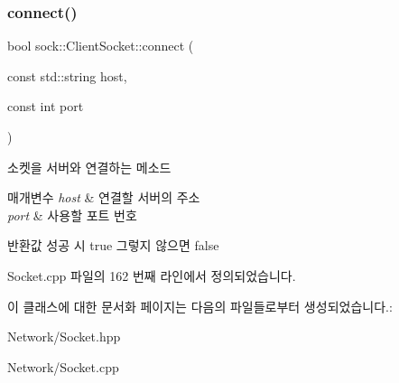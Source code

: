 \subsubsection{\texorpdfstring{connect()}{connect()}}
{\footnotesize\ttfamily bool sock\+::\+Client\+Socket\+::connect (\begin{DoxyParamCaption}\item[{const std\+::string}]{host,  }\item[{const int}]{port }\end{DoxyParamCaption})}



소켓을 서버와 연결하는 메소드 


\begin{DoxyParams}{매개변수}
{\em host} & 연결할 서버의 주소 \\
\hline
{\em port} & 사용할 포트 번호 \\
\hline
\end{DoxyParams}
\begin{DoxyReturn}{반환값}
성공 시 true 그렇지 않으면 false 
\end{DoxyReturn}


Socket.\+cpp 파일의 162 번째 라인에서 정의되었습니다.



이 클래스에 대한 문서화 페이지는 다음의 파일들로부터 생성되었습니다.\+:\begin{DoxyCompactItemize}
\item 
Network/Socket.\+hpp\item 
Network/Socket.\+cpp\end{DoxyCompactItemize}
